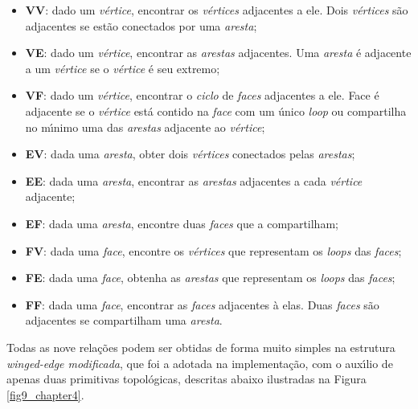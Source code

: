 \documentclass[12pt,a4paper]{book}
\begin{document}
\begin{itemize}
\item \textbf{VV}: dado um \textit{v\'{e}rtice}, encontrar os \textit{v\'{e}rtices} adjacentes a ele. Dois \textit{v\'{e}rtices} s\~{a}o adjacentes se est\~{a}o conectados por uma \textit{aresta};

\item \textbf{VE}: dado um \textit{v\'{e}rtice}, encontrar as \textit{arestas} adjacentes. Uma \textit{aresta} \'{e} adjacente a um \textit{v\'{e}rtice} se o \textit{v\'{e}rtice} \'{e} seu extremo;

\item \textbf{VF}: dado um \textit{v\'{e}rtice}, encontrar o \textit{ciclo} de \textit{faces} adjacentes a ele. Face \'{e} adjacente se o \textit{v\'{e}rtice} est\'{a} contido na \textit{face} com um \'{u}nico \textit{loop} ou compartilha no m\'{\i}nimo uma das \textit{arestas} adjacente ao \textit{v\'{e}rtice};

\item \textbf{EV}: dada uma \textit{aresta}, obter dois \textit{v\'{e}rtices} conectados pelas \textit{arestas};

\item \textbf{EE}: dada uma \textit{aresta}, encontrar as \textit{arestas} adjacentes a cada \textit{v\'{e}rtice} adjacente;

\item \textbf{EF}: dada uma \textit{aresta}, encontre duas \textit{faces} que a compartilham;

\item \textbf{FV}: dada uma \textit{face}, encontre os \textit{v\'{e}rtices} que representam os \textit{loops} das \textit{faces};

\item \textbf{FE}: dada uma \textit{face}, obtenha as \textit{arestas} que representam os \textit{loops} das \textit{faces};

\item \textbf{FF}: dada uma \textit{face}, encontrar as \textit{faces} adjacentes \`{a} elas. Duas \textit{faces} s\~{a}o adjacentes se compartilham uma \textit{aresta}.

\end{itemize}

Todas as nove rela\c{c}\~{o}es podem ser obtidas de forma muito simples na
estrutura \textit{winged-edge modificada}, que foi a adotada na implementa\c{c}\~{a}o, com o aux\'{\i}lio de apenas duas primitivas topol\'{o}gicas, descritas abaixo ilustradas na Figura \ref{fig9_chapter4}.
\end{document}
